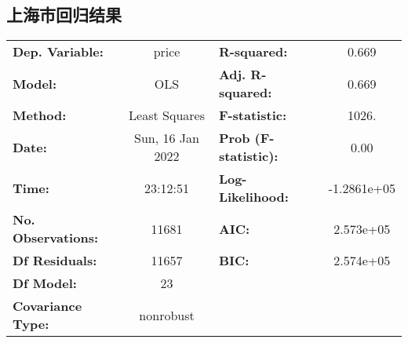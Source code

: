 \subsection{上海市回归结果}
\begin{table}[H]
  \centering
  \begin{tabular}{lclc}
    \toprule
    \textbf{Dep. Variable:}    & price            & \textbf{  R-squared:         } & 0.669       \\
    \textbf{Model:}            & OLS              & \textbf{  Adj. R-squared:    } & 0.669       \\
    \textbf{Method:}           & Least Squares    & \textbf{  F-statistic:       } & 1026.       \\
    \textbf{Date:}             & Sun, 16 Jan 2022 & \textbf{  Prob (F-statistic):} & 0.00        \\
    \textbf{Time:}             & 23:12:51         & \textbf{  Log-Likelihood:    } & -1.2861e+05 \\
    \textbf{No. Observations:} & 11681            & \textbf{  AIC:               } & 2.573e+05   \\
    \textbf{Df Residuals:}     & 11657            & \textbf{  BIC:               } & 2.574e+05   \\
    \textbf{Df Model:}         & 23               & \textbf{                     } &             \\
    \textbf{Covariance Type:}  & nonrobust        & \textbf{                     } &             \\
    \bottomrule
  \end{tabular}
\end{table}
